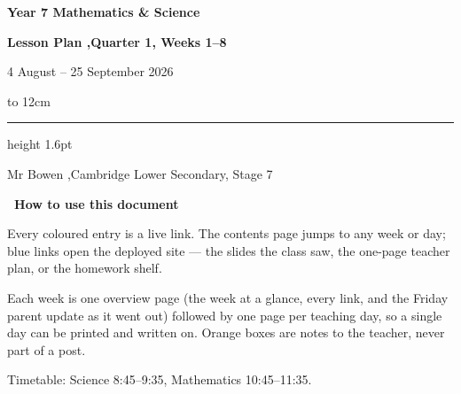 \documentclass[11pt]{article}
\begin{document}
\thispagestyle{empty}
\vspace*{1.6cm}
\begin{center}
  {\Huge\bfseries\color{cbteal}Year 7 Mathematics \& Science}\par\vspace{10pt}
  {\LARGE\bfseries\color{black!70}Lesson Plan \sep Quarter 1, Weeks 1--8}\par\vspace{6pt}
  {\Large\color{black!55}4 August -- 25 September 2026}\par\vspace{22pt}
  \leavevmode\hbox to 12cm{\color{cbteal!40}\leaders\hrule height 1.6pt\hfill}\par\vspace{20pt}
  {\large\color{black!70}Mr Bowen \sep Cambridge Lower Secondary, Stage 7}\par
\end{center}

\vspace{20pt}
\begin{center}
\begin{minipage}{17cm}
\small
{\bfseries\color{cborange}~How to use this document}\par\vspace{6pt}
Every coloured entry is a live link. The contents page jumps to any week or
day; \textcolor{cbblue}{blue} links open the deployed site --- the slides the
class saw, the one-page teacher plan, or the homework shelf.\par\vspace{5pt}
Each week is one overview page (the week at a glance, every link, and the
Friday parent update as it went out) followed by one page per teaching day,
so a single day can be printed and written on. Orange boxes are notes to the
teacher, never part of a post.\par\vspace{5pt}
Timetable: Science 8:45--9:35, Mathematics 10:45--11:35.
\end{minipage}
\end{center}

\clearpage
{}\label{toc}
\end{document}
